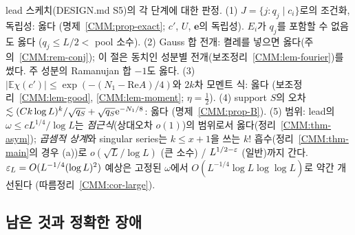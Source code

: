 \begin{remark}\label{CMM:rem-S5}
lead 스케치(DESIGN.md S5)의 각 단계에 대한 판정.
(1) $J=\{j:q_j\mid c_i\}$로의 조건화, 독립성: 옳다 (명제~\ref{CMM:prop-exact}; $c'$, $U$, $\mathbf e$의 독립성). $E_i$가 $q_j$를 포함할 수 없음도 옳다 ($q_j\le L/2<$ pool 소수).
(2) Gauss 합 전개: 켤레를 넣으면 옳다(주의~\ref{CMM:rem-conj}); 이 절은 동치인 성분별 전개(보조정리~\ref{CMM:lem-fourier})를 썼다. 주 성분의 Ramanujan 합 $-1$도 옳다.
(3) $|\mathbb E\chi(c')|\le\exp(-(N_1-\mathrm{Re}A)/4)$와 $2k$차 모멘트 식: 옳다 (보조정리~\ref{CMM:lem-good}, \ref{CMM:lem-moment}; $\eta=\frac12$).
(4) support $S$의 오차 $\lesssim(Ck\log L)^k/\sqrt{q_S}+\sqrt{q_S}\mathrm{e}^{-N_1/8}$: 옳다 (명제~\ref{CMM:prop-B}).
(5) 범위: lead의 $\omega\le cL^{1/4}/\log L$는 \emph{점근식}(상대오차 $o(1)$)의 범위로서 옳다(정리~\ref{CMM:thm-asym}); \emph{곱셈적 상계}와 singular series는 $k\le x+1$을 쓰는
$k!$ 흡수(정리~\ref{CMM:thm-main}의 경우 (a))로 $o(\sqrt L/\log L)$ (큰 소수) / $L^{1/2-\varepsilon}$ (일반)까지 간다. $\varepsilon_L=O(L^{-1/4}(\log L)^2)$ 예상은 고정된 $\omega$에서
$O(L^{-1/4}\log L\log\log L)$로 약간 개선된다 (따름정리~\ref{CMM:cor-large}).
\end{remark}

\subsection{남은 것과 정확한 장애}\label{CMM:ssec-open}

